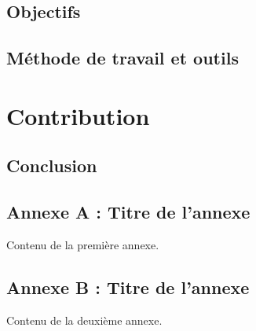 \documentclass[11pt]{report}
\theoremstyle{definition}
\theoremstyle{remark}
\begin{document}
    \section{Objectifs}
    \section{Méthode de travail et outils}

\newpage
\chapter{Contribution}
    

\section{Conclusion}

\newpage

\printbibliography

\newpage

\appendix

\section{Annexe A : Titre de l'annexe}
Contenu de la première annexe.

\section{Annexe B : Titre de l'annexe}
Contenu de la deuxième annexe.

\end{document}

